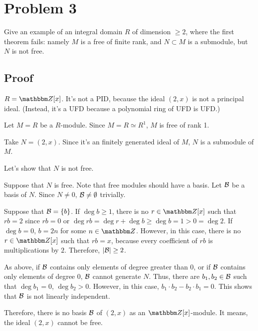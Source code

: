 \section*{Problem 3}

Give an example of an integral domain \(R\) of dimension \(\ge 2\),
where the first theorem fails:
namely \(M\) is a free of finite rank,
and \(N \subset M\) is a submodule,
but \(N\) is not free.

\subsection*{Proof}

\(R = \bbZ[x]\).
It's not a PID, because the ideal \((2, x)\) is not a principal ideal.
(Instead, it's a UFD because a polynomial ring of UFD is UFD.)

Let \(M = R\) be a \(R\)-module.
Since \(M = R \simeq R^1\), \(M\) is free of rank 1.

Take \(N = (2, x)\).
Since it's an finitely generated ideal of \(M\), \(N\) is a submodule of \(M\).

Let's show that \(N\) is not free.

Suppose that \(N\) is free.
Note that free modules should have a basis.
Let \(\mathcal{B}\) be a basis of \(N\).
Since \(N \neq 0\), \(\mathcal{B} \neq \emptyset\) trivially.

Suppose that \(\mathcal{B} = \{b\}\).
If \(\deg b \ge 1\), there is no \(r \in \bbZ[x]\) such that \(rb = 2\)
since \(rb = 0\) or \(\deg rb = \deg r + \deg b \ge \deg b = 1 > 0 = \deg 2\).
If \(\deg b = 0\), \(b = 2n\) for some \(n \in \bbZ\).
However, in this case, there is no \(r \in \bbZ[x]\) such that \(rb = x\), because every coefficient of \(rb\) is multiplications by \(2\).
Therefore, \(|\mathcal{B}| \ge 2\).

As above, if \(\mathcal{B}\) contains only elements of degree greater than 0, or if \(\mathcal{B}\) contains only elements of degree 0, \(\mathcal{B}\) cannot generate \(N\).
Thus, there are \(b_1, b_2 \in \mathcal{B}\) such that \(\deg b_1 = 0\), \(\deg b_2 > 0\).
However, in this case,
\(b_1 \cdot b_2 - b_2 \cdot b_1 = 0\).
This shows that \(\mathcal{B}\) is not linearly independent.

Therefore, there is no basis \(\mathcal{B}\) of \((2, x)\) as an \(\bbZ[x]\)-module.
It means, the ideal \((2, x)\) cannot be free.
\qedsq
